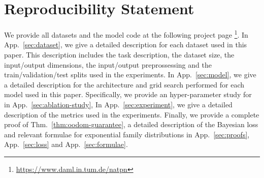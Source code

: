 \section{Reproducibility Statement}

We provide all datasets and the model code at the following project page \footnote{\url{https://www.daml.in.tum.de/natpn}}. In App.~\ref{sec:dataset}, we give a detailed description for each dataset used in this paper. This description includes the task description, the dataset size, the input/output dimensions, the input/output preprossessing and the train/validation/test splits used in the experiments. In App.~\ref{sec:model}, we give a detailed description for the architecture and grid search performed for each model used in this paper. Specifically, we provide an hyper-parameter study for \oursacro{} in App.~\ref{sec:ablation-study}, In App.~\ref{sec:experiment}, we give a detailed description of the metrics used in the experiments. Finally, we provide a complete proof of Thm.~\ref{thm:oodom-guarantee}, a detailed description of the Bayesian loss and relevant formulae for exponential family distributions in App.~\ref{sec:proofs}, App.~\ref{sec:loss} and App.~\ref{sec:formulae}. 